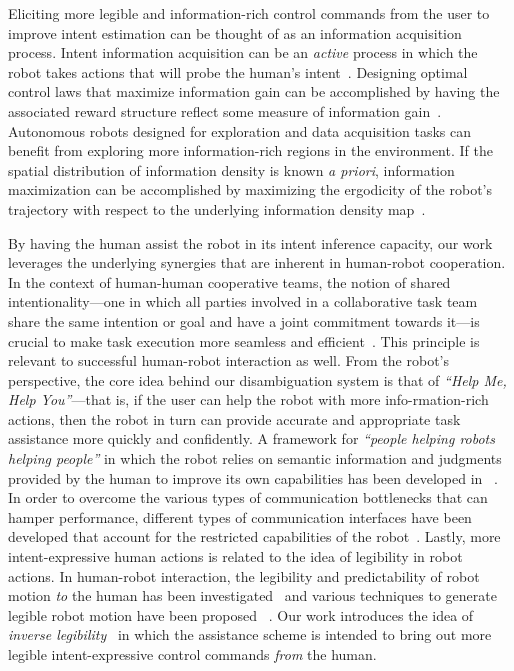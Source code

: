 \documentclass[natbib, twocolumn]{svjour3}          %
\begin{document}
Eliciting more legible and information-rich control commands from the user to improve intent estimation can be thought of as an information acquisition process. Intent information acquisition can be an \textit{active} process in which the robot takes actions that will probe the human's intent~\citep{sadigh2016information, sadigh2016planning}. Designing optimal control laws that maximize information gain can be accomplished by having the associated reward structure reflect some measure of information gain~\citep{atanasov2014information}. 
Autonomous robots designed for exploration and data acquisition tasks can benefit from exploring more information-rich regions in the environment. If the spatial distribution of information density is known \textit{a priori}, information maximization can be accomplished by maximizing the ergodicity of the robot's trajectory with respect to the underlying information density map~\citep{miller2016ergodic, miller2013trajectory}. 

By having the human assist the robot in its intent inference capacity, our work leverages the underlying synergies that are inherent in human-robot cooperation. In the context of human-human cooperative teams, the notion of shared intentionality---one in which all parties involved in a collaborative task team share the same intention or goal and have a joint commitment towards it---is crucial to make task execution more seamless and efficient~\citep{tomasello2007shared, tomasello2010gap}. This principle is relevant to successful human-robot interaction as well. From the robot's perspective, the core idea behind our disambiguation system is that of \textit{``Help Me, Help You''}---that is, if the user can help the robot with more info-rmation-rich actions, then the robot in turn can provide accurate and appropriate task assistance more quickly and confidently. A framework for \textit{``people helping robots helping people''} in which the robot relies on semantic information and judgments provided by the human to improve its own capabilities has been developed in ~\citep{sorokin2010people}. In order to overcome the various types of communication bottlenecks that can hamper performance, different types of communication interfaces have been developed that account for the restricted capabilities of the robot~\citep{goodfellow2010help}. Lastly, more intent-expressive human actions is related to the idea of legibility in robot actions. In human-robot interaction, the legibility and predictability of robot motion \textit{to} the human has been investigated~\citep{dragan2013legibility} and various techniques to generate legible robot motion have been proposed ~\citep{holladay2014legible}. Our work introduces the idea of \textit{inverse legibility}~\citep{gopinath2017mode} in which the assistance scheme is intended to bring out more legible intent-expressive control commands \textit{from} the human. 
\end{document}
